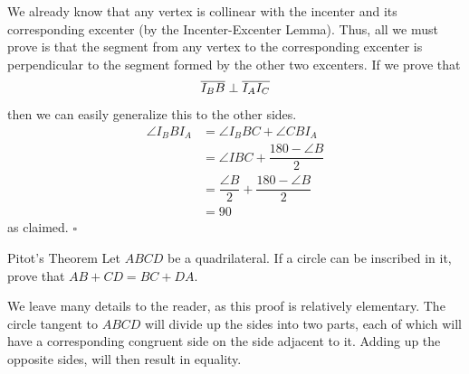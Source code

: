 \documentclass{article}
\begin{document}
We already know that any vertex is collinear with the incenter and its corresponding excenter (by the Incenter-Excenter Lemma). Thus, all we must prove is that the segment from any vertex to the corresponding excenter is perpendicular to the segment formed by the other two excenters. If we prove that \[\overline{I_BB} \perp \overline{I_AI_C}\] then we can easily generalize this to the other sides.
\begin{align*}
\angle I_BBI_A &= \angle I_BBC + \angle CBI_A \\
&= \angle IBC + \dfrac{180 - \angle B}{2} \\
&= \dfrac{\angle B}{2} + \dfrac{180 - \angle B}{2} \\
&= 90
\end{align*}
as claimed. $\square$

\begin{problem}[2.25]{Pitot's Theorem}
Let $ABCD$ be a quadrilateral. If a circle can be inscribed in it, prove that $AB+CD = BC+DA$.
\end{problem}
We leave many details to the reader, as this proof is relatively elementary. The circle tangent to $ABCD$ will divide up the sides into two parts, each of which will have a corresponding congruent side on the side adjacent to it. Adding up the opposite sides, will then result in equality.
\end{document}
